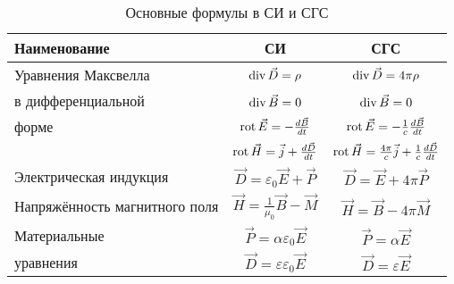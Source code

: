 \begin{longtable}{|L{4cm}|c|c|}
	\caption{Основные формулы в СИ и СГС}
	\hline
	Наименование                                 &                                    СИ                                     &                                              СГС                                               \\ \hline
	Уравнения Максвелла                          &                            $\mathop{\mathrm{div}}\vec{D}=\rho$                             &                                     $\mathop{\mathrm{div}}\vec{D}=4\pi\rho$                                     \\ 
	в дифференциальной                           &                              $\mathop{\mathrm{div}}\vec{B}=0$                              &                                        $\mathop{\mathrm{div}}\vec{B}=0$                                         \\
	форме                                        &                   $\mathop{\mathrm{rot}}\vec{E}=-\frac{d\vec{B}}{d t}$                   &                        $\mathop{\mathrm{rot}}\vec{E}=-\frac{1}{c}\frac{d\vec{B}}{d t}$                        \\
	                                             &               $\mathop{\mathrm{rot}}\vec{H}=\vec{j}+\frac{d\vec{D}}{d t}$                &             $\mathop{\mathrm{rot}}\vec{H}=\frac{4\pi}{c}\vec{j}+\frac{1}{c}\frac{d\vec{D}}{d t}$              \\ \hline
	Электрическая индукция                       &                    $\vec{D}=\varepsilon_0\vec{E}+\vec{P}$                    &                                 $\vec{D}=\vec{E}+4\pi\vec{P}$                                  \\ \hline
	Напряжённость магнитного поля                &                 $\vec{H}=\frac{1}{\mu_0}\vec{B}-\vec{M}$                  &                                 $\vec{H}=\vec{B}-4\pi\vec{M}$                                  \\ \hline
	Материальные                                 &                     $\vec{P}=\alpha\varepsilon_0\vec{E}$                     &                                    $\vec{P}=\alpha\vec{E}$                                     \\
	уравнения                                    &                    $\vec{D}=\varepsilon\varepsilon_0\vec{E}$                    &                                   $\vec{D}=\varepsilon\vec{E}$                                    \\

\end{longtable}
